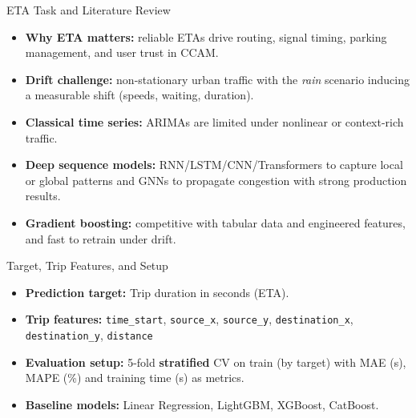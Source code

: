 \documentclass[aspectratio=169,11pt]{beamer}
\begin{document}
\begin{frame}{ETA Task and Literature Review}
    \begin{itemize}
        \item \textbf{Why ETA matters:} reliable ETAs drive routing, signal timing, parking management, and user trust in CCAM.
        \item \textbf{Drift challenge:} non-stationary urban traffic with the \emph{rain} scenario inducing a measurable shift (speeds, waiting, duration).
    \end{itemize}

    \bigskip
    \begin{itemize}
        \item \textbf{Classical time series:} ARIMAs are limited under nonlinear or context-rich traffic.
        \item \textbf{Deep sequence models:} RNN/LSTM/CNN/Transformers to capture local or global patterns and GNNs to propagate congestion with strong production results.
        \item \textbf{Gradient boosting:} competitive with tabular data and engineered features, and fast to retrain under drift.
    \end{itemize}
\end{frame}

\begin{frame}{Target, Trip Features, and Setup}
    \begin{itemize}
        \item \textbf{Prediction target:} Trip duration in seconds (ETA).
            \medskip
        \item \textbf{Trip features:} \texttt{time\_start}, \texttt{source\_x}, \texttt{source\_y}, \texttt{destination\_x}, \texttt{destination\_y}, \texttt{distance}
            \medskip
        \item \textbf{Evaluation setup:} 5-fold \textbf{stratified} CV on train (by target) with MAE (s), MAPE (\%) and training time (s) as metrics.
            \medskip
        \item \textbf{Baseline models:} Linear Regression, LightGBM, XGBoost, CatBoost.
    \end{itemize}
\end{frame}
\end{document}
